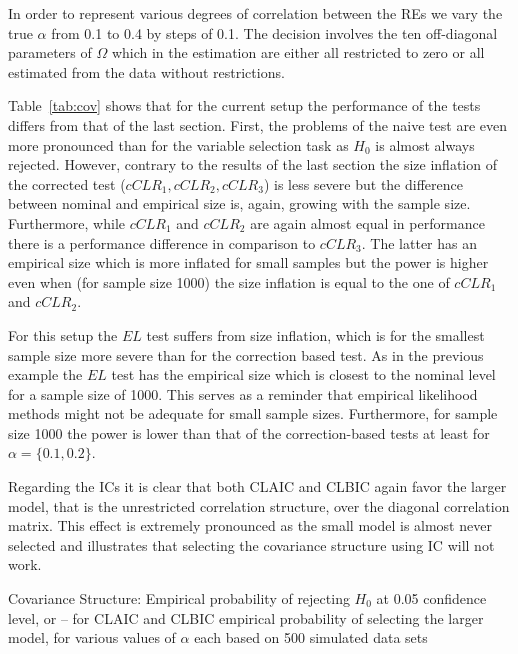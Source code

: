 \documentclass[12pt, a4paper]{article}
\numberwithin{defcounter}{section}
\numberwithin{excounter}{section}
\begin{document}
In order to represent various degrees of correlation between the \ac{RE}s we vary the true $\alpha$ from 0.1 to 0.4 by steps of 0.1. The decision involves the ten off-diagonal parameters of $\Omega$ %
which in the estimation are either all restricted to zero or all estimated from the data without restrictions.

Table~\ref{tab:cov} shows that for the current setup the performance of the tests differs from that of the last section. First, the problems of the naive test are even more pronounced than for the variable selection task as $H_0$ is almost always rejected. However, contrary to the results of the last section the size inflation of the corrected test ($cCLR_1, cCLR_2, cCLR_3$) is less severe but the difference between nominal and empirical size is, again, growing with the sample size.  Furthermore, while $cCLR_1$ and $cCLR_2$ are again almost equal in performance there is a performance difference in comparison to $cCLR_3$. The latter has an empirical size which is more inflated for small samples but the power is higher even when (for sample size 1000) the size inflation is equal to the one of $cCLR_1$ and $cCLR_2$. 

For this setup the $EL$ test suffers from size inflation, which is for the smallest sample size more severe than for the correction based test. As in the previous example the $EL$ test has the empirical size which is closest to the nominal level for a sample size of 1000. This serves as a reminder that empirical likelihood methods might not be adequate for small sample sizes. Furthermore, for sample size 1000 the power is lower than that of the correction-based tests at least for $\alpha = \{0.1, 0.2\}$. 

Regarding the \ac{IC}s it is clear that both \ac{CLAIC} and \ac{CLBIC} again favor the larger model, that is the unrestricted correlation structure, over the diagonal correlation matrix. This effect is extremely pronounced as the small model is almost never selected and illustrates that selecting the covariance structure using \ac{IC} will not work.

\begin{table}[H]
\centering
\caption{Covariance Structure: Empirical probability of rejecting $H_0$ at 0.05 confidence level, or -- for \ac{CLAIC} and \ac{CLBIC} empirical probability of selecting the larger model,  for various values of $\alpha$ each based on 500 simulated data sets}

\label{tab:cov}
\end{table}
\end{document}
